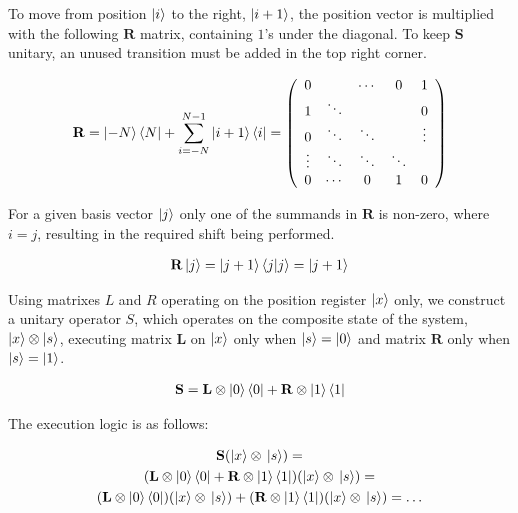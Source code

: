 \begin{definition}

To move from position $\ket{i}$ to the right, $\ket{i+1}$, the position vector is multiplied with the following $\mathbf{R}$ matrix, containing $1$'s under the diagonal. To keep $\mathbf{S}$ unitary, an unused transition must be added in the top right corner.


\begin{align*}
\mathbf{R} = \ket{-N}\bra{N} + \sum\limits_{i=-N}^{N-1} \ket{i+1}\bra{i} =
\left(
    \begin{array}{ccccc}
        0      &        & \cdots & 0      & 1      \\
        1      & \ddots &        &        & 0      \\
        0      & \ddots & \ddots &        & \vdots \\
        \vdots & \ddots & \ddots & \ddots &        \\
        0      & \cdots & 0      & 1      & 0
      \end{array}
\right)
\end{align*}

For a given basis vector $\ket{j}$ only one of the summands in $\mathbf{R}$ is non-zero, where $i=j$, resulting in the required shift being performed.

\begin{align*}
\mathbf{R}\ket{j} = \ket{j+1}\bra{j}\ket{j} = \ket{j+1}
\end{align*}

\end{definition}


Using matrixes $L$ and $R$ operating on the position register $\ket{x}$ only, we construct a unitary operator $S$, which operates on the composite state of the system, $\ket{x} \otimes \ket{s}$, executing matrix $\mathbf{L}$ on $\ket{x}$ only when $\ket{s} = \ket{0}$ and matrix $\mathbf{R}$ only when $\ket{s}=\ket{1}$.

\begin{align*}
  \mathbf{S} = \mathbf{L}\otimes\ket{0}\bra{0} + \mathbf{R}\otimes\ket{1}\bra{1}
\end{align*}

The execution logic is as follows:

\begin{gather*}
    \mathbf{S}(\ket{x}\otimes{}\ket{s}) = \\
    (\mathbf{L}\otimes\ket{0}\bra{0} + \mathbf{R}\otimes\ket{1}\bra{1})(\ket{x}\otimes{}\ket{s}) = \\ (\mathbf{L}\otimes\ket{0}\bra{0})(\ket{x}\otimes{}\ket{s}) + (\mathbf{R}\otimes\ket{1}\bra{1})(\ket{x}\otimes{}\ket{s}) = \dots
\end{gather*}

